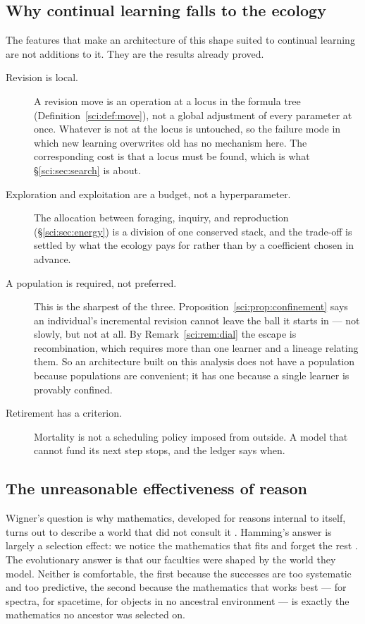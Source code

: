 \subsection{Why continual learning falls to the ecology}\label{sci:S17.2}

The features that make an architecture of this shape suited to continual learning are not additions to
it. They are the results already proved.

\begin{description}
\item[Revision is local.] A revision move is an operation at a locus in the formula tree
(Definition~\ref{sci:def:move}), not a global adjustment of every parameter at once. Whatever is not at the
locus is untouched, so the failure mode in which new learning overwrites old has no mechanism here.
The corresponding cost is that a locus must be found, which is what \S\ref{sci:sec:search} is about.

\item[Exploration and exploitation are a budget, not a hyperparameter.] The allocation between
foraging, inquiry, and reproduction (\S\ref{sci:sec:energy}) is a division of one conserved stack, and the
trade-off is settled by what the ecology pays for rather than by a coefficient chosen in advance.

\item[A population is required, not preferred.] This is the sharpest of the three.
Proposition~\ref{sci:prop:confinement} says an individual's incremental revision cannot leave the ball it
starts in --- not slowly, but not at all. By Remark~\ref{sci:rem:dial} the escape is recombination, which
requires more than one learner and a lineage relating them. So an architecture built on this analysis
does not have a population because populations are convenient; it has one because a single learner is
provably confined.

\item[Retirement has a criterion.] Mortality is not a scheduling policy imposed from outside. A model
that cannot fund its next step stops, and the ledger says when.
\end{description}

\subsection{The unreasonable effectiveness of reason}\label{sci:S17.3}

Wigner's question is why mathematics, developed for reasons internal to itself, turns out to describe a
world that did not consult it \cite{Wigner}. Hamming's answer is largely a selection effect: we notice
the mathematics that fits and forget the rest \cite{Hamming}. The evolutionary answer is that our
faculties were shaped by the world they model. Neither is comfortable, the first because the successes
are too systematic and too predictive, the second because the mathematics that works best --- for
spectra, for spacetime, for objects in no ancestral environment --- is exactly the mathematics no
ancestor was selected on.

